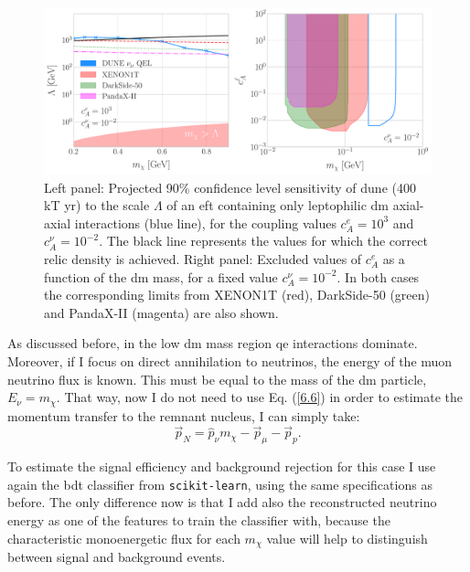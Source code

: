 \begin{figure}[t]
	\centering
	\includegraphics[width=1\linewidth]{Images/DM_Analysis/eft_bounds.pdf}
	\caption[Projected 90\% confidence level sensitivity of \gls{dune} to the scale $\Lambda$ of an \gls{eft} containing only leptophilic \gls{dm} axial-axial interactions.]{Left panel: Projected 90\% confidence level sensitivity of \gls{dune} (400 kT yr) to the scale $\Lambda$ of an \gls{eft} containing only leptophilic \gls{dm} axial-axial interactions (blue line), for the coupling values $c_{A}^{e} = 10^{3}$ and $c_{A}^{\nu} = 10^{-2}$. The black line represents the values for which the correct relic density is achieved. Right panel: Excluded values of $c_{A}^{e}$ as a function of the \gls{dm} mass, for a fixed value $c_{A}^{\nu} = 10^{-2}$. In both cases the corresponding limits from XENON1T \cite{XENON2019} (red), DarkSide-50 \cite{DarkSide2022} (green) and PandaX-II \cite{PandaX-II2021} (magenta) are also shown.}
	\label{fig:eft_bounds}
\end{figure}

As discussed before, in the low \gls{dm} mass region \gls{qe} interactions dominate. Moreover, if I focus on direct annihilation to neutrinos, the energy of the muon neutrino flux is known. This must be equal to the mass of the \gls{dm} particle, $E_{\nu} = m_{\chi}$. That way, now I do not need to use Eq. (\ref{6.6}) in order to estimate the momentum transfer to the remnant nucleus, I can simply take:
\begin{equation}\label{7.6}
	\vec{p}_{N} = \hat{p}_{\nu} m_{\chi} - \vec{p}_{\mu} - \vec{p}_{p}.
\end{equation}

To estimate the signal efficiency and background rejection for this case I use again the \gls{bdt} classifier from \texttt{scikit-learn}, using the same specifications as before. The only difference now is that I add also the reconstructed neutrino energy as one of the features to train the classifier with, because the characteristic monoenergetic flux for each $m_{\chi}$ value will help to distinguish between signal and background events.

